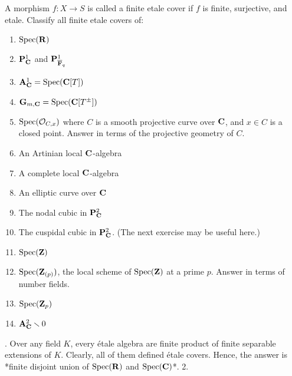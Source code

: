 \documentclass{amsart}
\begin{document}
\begin{problem}
    A morphism $f:X \to S$ is called a finite etale cover if $f$ is finite, surjective, and etale. Classify all finite etale covers of:
    \begin{enumerate}
        \item $\operatorname{Spec}(\mathbf{R})$
        \item $\mathbf{P}^{1}_{\mathbf{C}}$ and $\mathbf{P}^{1}_{\overline{\mathbf{F}}_{q}}$
        \item $\mathbf{A}^{1}_{\mathbf{C}} = \operatorname{Spec}(\mathbf{C}[T])$
        \item $\mathbf{G}_{m, \mathbf{C}} = \operatorname{Spec}(\mathbf{C}[T^{\pm}])$
        \item $\operatorname{Spec}(\mathcal{O}_{C,x})$ where $C$ is a smooth projective curve over $\mathbf{C}$, and $x \in C$ is a closed point. Answer in terms of the projective geometry of $C$.
        \item An Artinian local $\mathbf{C}$-algebra
        \item A complete local $\mathbf{C}$-algebra
        \item An elliptic curve over $\mathbf{C}$
        \item The nodal cubic in $\mathbf{P}^{2}_{\mathbf{C}}$
        \item The cuspidal cubic in $\mathbf{P}^{2}_{\mathbf{C}}$. (The next exercise may be useful here.)
        \item $\operatorname{Spec}(\mathbf{Z})$
        \item $\operatorname{Spec}(\mathbf{Z}_{(p)})$, the local scheme of $\operatorname{Spec}(\mathbf{Z})$ at a prime $p$. Answer in terms of number fields.
        \item $\operatorname{Spec}(\mathbf{Z}_{p})$
        \item $\mathbf{A}^{2}_{\mathbf{C}} \smallsetminus 0$
    \end{enumerate}
\end{problem}

. Over any field $K$, every étale algebra are finite product of finite separable extensions of $K$. Clearly, all of them defined étale covers. Hence, the answer is *finite disjoint union of $\operatorname{Spec}(\mathbf{R})$ and $\operatorname{Spec}(\mathbf{C})$*.
2. 
\end{document}
